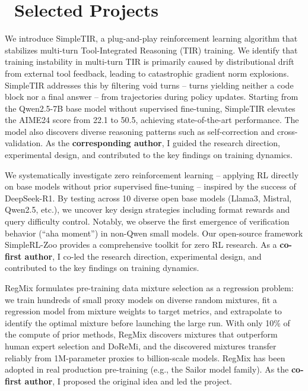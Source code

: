 \documentclass{resume}
\begin{document}
\section{\faAnchor\ Selected Projects}


We introduce SimpleTIR, a plug-and-play reinforcement learning algorithm that stabilizes multi-turn Tool-Integrated Reasoning (TIR) training. We identify that training instability in multi-turn TIR is primarily caused by distributional drift from external tool feedback, leading to catastrophic gradient norm explosions. SimpleTIR addresses this by filtering void turns -- turns yielding neither a code block nor a final answer -- from trajectories during policy updates. Starting from the Qwen2.5-7B base model without supervised fine-tuning, SimpleTIR elevates the AIME24 score from 22.1 to 50.5, achieving state-of-the-art performance. The model also discovers diverse reasoning patterns such as self-correction and cross-validation.
As the \textbf{corresponding author}, I guided the research direction, experimental design, and contributed to the key findings on training dynamics.

We systematically investigate zero reinforcement learning -- applying RL directly on base models without prior supervised fine-tuning -- inspired by the success of DeepSeek-R1. By testing across 10 diverse open base models (Llama3, Mistral, Qwen2.5, etc.), we uncover key design strategies including format rewards and query difficulty control. Notably, we observe the first emergence of verification behavior (``aha moment'') in non-Qwen small models. Our open-source framework SimpleRL-Zoo provides a comprehensive toolkit for zero RL research.
As a \textbf{co-first author}, I co-led the research direction, experimental design, and contributed to the key findings on training dynamics.

RegMix formulates pre-training data mixture selection as a regression problem: we train hundreds of small proxy models on diverse random mixtures, fit a regression model from mixture weights to target metrics, and extrapolate to identify the optimal mixture before launching the large run. With only 10\% of the compute of prior methods, RegMix discovers mixtures that outperform human expert selection and DoReMi, and the discovered mixtures transfer reliably from 1M-parameter proxies to billion-scale models. RegMix has been adopted in real production pre-training (e.g., the Sailor model family). As the \textbf{co-first author}, I proposed the original idea and led the project.
\end{document}
